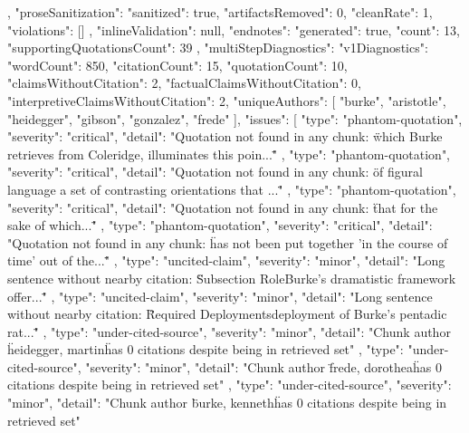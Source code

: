 {{{    },
    "proseSanitization": {
      "sanitized": true,
      "artifactsRemoved": 0,
      "cleanRate": 1,
      "violations": []
    },
    "inlineValidation": null,
    "endnotes": {
      "generated": true,
      "count": 13,
      "supportingQuotationsCount": 39
    },
    "multiStepDiagnostics": {
      "v1Diagnostics": {
        "wordCount": 850,
        "citationCount": 15,
        "quotationCount": 10,
        "claimsWithoutCitation": 2,
        "factualClaimsWithoutCitation": 0,
        "interpretiveClaimsWithoutCitation": 2,
        "uniqueAuthors": [
          "burke",
          "aristotle",
          "heidegger",
          "gibson",
          "gonzalez",
          "frede"
        ],
        "issues": [
          {
            "type": "phantom-quotation",
            "severity": "critical",
            "detail": "Quotation not found in any chunk: \" which Burke retrieves from Coleridge, illuminates this poin...\""
          },
          {
            "type": "phantom-quotation",
            "severity": "critical",
            "detail": "Quotation not found in any chunk: \" of figural language a set of contrasting orientations that ...\""
          },
          {
            "type": "phantom-quotation",
            "severity": "critical",
            "detail": "Quotation not found in any chunk: \"that for the sake of which...\""
          },
          {
            "type": "phantom-quotation",
            "severity": "critical",
            "detail": "Quotation not found in any chunk: \"has not been put together 'in the course of time' out of the...\""
          },
          {
            "type": "uncited-claim",
            "severity": "minor",
            "detail": "Long sentence without nearby citation: \"Subsection Role\n\nKenneth Burke's dramatistic framework offer...\""
          },
          {
            "type": "uncited-claim",
            "severity": "minor",
            "detail": "Long sentence without nearby citation: \"Required Deployments\n\nThe deployment of Burke's pentadic rat...\""
          },
          {
            "type": "under-cited-source",
            "severity": "minor",
            "detail": "Chunk author \"heidegger, martin\" has 0 citations despite being in retrieved set"
          },
          {
            "type": "under-cited-source",
            "severity": "minor",
            "detail": "Chunk author \"frede, dorothea\" has 0 citations despite being in retrieved set"
          },
          {
            "type": "under-cited-source",
            "severity": "minor",
            "detail": "Chunk author \"burke, kenneth\" has 0 citations despite being in retrieved set"
}}}}}
